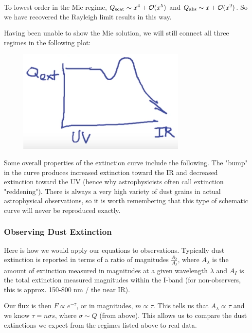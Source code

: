 \documentclass{article}
\begin{document}
\begin{itemize}
\begin{itemize}
        To lowest order in the Mie regime, $Q_{\rm{scat}} \sim x^{4} + \mathcal{O}(x^{5})$ and $Q_{\rm{abs}} \sim x + \mathcal{O}(x^{2})$. So we have recovered the Rayleigh limit results in this way. 

        Having been unable to show the Mie solution, we will still connect all three regimes in the following plot:
    \end{itemize}
\end{itemize}

\begin{figure}[ht]
    \centering
    \includegraphics[width=0.75\textwidth]{Regimes.png}
    \label{fig:reg}
\end{figure}

Some overall properties of the extinction curve include the following. The "bump" in the curve produces increased extinction toward the IR and decreased extinction toward the UV (hence why astrophysicists often call extinction "reddening"). There is always a very high variety of dust grains in actual astrophysical observations, so it is worth remembering that this type of schematic curve will never be reproduced exactly. 

\subsubsection*{ Observing Dust Extinction}

Here is how we would apply our equations to observations. 
Typically dust extinction is reported in terms of a ratio of magnitudes $\frac{A_{\lambda}}{A_{I}}$, where $A_{\lambda}$ is the amount of extinction measured in magnitudes at a given wavelength $\lambda$ and $A_{I}$ is the total extinction measured magnitudes within the I-band (for non-observers, this is approx. 150-800 nm / the near IR). 

Our flux is then $F \propto e^{-\tau}$, or in magnitudes, $m \propto \tau$. 
This tells us that $A_{\lambda} \propto \tau$ and we know $\tau = n \sigma s$, where $\sigma \sim Q$ (from above). This allows us to compare the dust extinctions we expect from the regimes listed above to real data.
\end{document}
